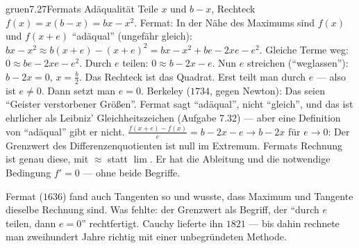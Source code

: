\begin{loesungkarte}{gruen}{7.27}{Fermats Adäqualität}
Teile $x$ und $b - x$, Rechteck $f(x) = x(b - x) = bx - x^{2}$. Fermat: In der Nähe des Maximums sind $f(x)$ und $f(x + e)$ \enquote{adäqual} (ungefähr gleich): $bx - x^{2}\approx b(x + e) - (x + e)^{2} = bx - x^{2} + be - 2xe - e^{2}$.
Gleiche Terme weg: $0\approx be - 2xe - e^{2}$. Durch $e$ teilen: $0\approx b - 2x - e$. Nun $e$ streichen (\enquote{weglassen}): $b - 2x = 0$, $x = \frac b2$. Das Rechteck ist das Quadrat.
Erst teilt man durch $e$ --- also ist $e\neq0$. Dann setzt man $e = 0$. Berkeley ($1734$, gegen Newton): Das seien \enquote{Geister verstorbener Größen}. Fermat sagt \enquote{adäqual}, nicht \enquote{gleich}, und das ist ehrlicher als Leibniz' Gleichheitszeichen (Aufgabe 7.32) --- aber eine Definition von \enquote{adäqual} gibt er nicht.
$\frac{f(x + e) - f(x)}e = b - 2x - e\to b - 2x$ für $e\to0$: Der Grenzwert des Differenzenquotienten ist null im Extremum. Fermats Rechnung ist genau diese, mit $\approx$ statt $\lim$. Er hat die Ableitung und die notwendige Bedingung $f' = 0$ --- ohne beide Begriffe.
\begin{mitnehmen}\kastentext
Fermat ($1636$) fand auch Tangenten so und wusste, dass Maximum und Tangente dieselbe Rechnung sind. Was fehlte: der Grenzwert als Begriff, der \enquote{durch $e$ teilen, dann $e = 0$} rechtfertigt. Cauchy lieferte ihn $1821$ --- bis dahin rechnete man zweihundert Jahre richtig mit einer unbegründeten Methode.
\end{mitnehmen}
\end{loesungkarte}

